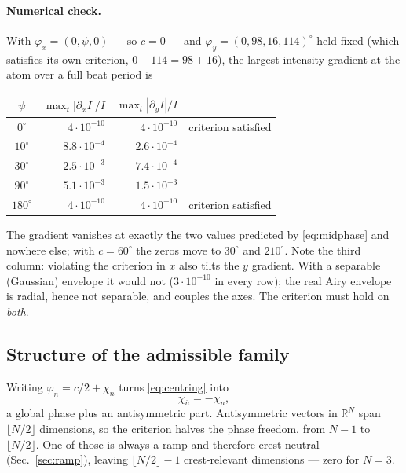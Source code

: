 \documentclass[11pt,a4paper]{article}
\begin{document}
\paragraph{Numerical check.} With $\varphi_x=(0,\psi,0)$ --- so $c=0$ --- and
$\varphi_y=(0,98,16,114)^\circ$ held fixed (which satisfies its own criterion,
$0+114=98+16$), the largest intensity gradient at the atom over a full beat
period is

\begin{center}\small
\begin{tabular}{crrl}
\toprule
$\psi$ & $\max_t|\partial_xI|/I$ & $\max_t|\partial_yI|/I$ &\\
\midrule
$0^\circ$ & $4\cdot10^{-10}$ & $4\cdot10^{-10}$ & criterion satisfied\\
$10^\circ$ & $8.8\cdot10^{-4}$ & $2.6\cdot10^{-4}$ &\\
$30^\circ$ & $2.5\cdot10^{-3}$ & $7.4\cdot10^{-4}$ &\\
$90^\circ$ & $5.1\cdot10^{-3}$ & $1.5\cdot10^{-3}$ &\\
$180^\circ$ & $4\cdot10^{-10}$ & $4\cdot10^{-10}$ & criterion satisfied\\
\bottomrule
\end{tabular}
\end{center}

\noindent The gradient vanishes at exactly the two values predicted by
\eqref{eq:midphase} and nowhere else; with $c=60^\circ$ the zeros move to
$30^\circ$ and $210^\circ$. Note the third column: violating the criterion in
$x$ also tilts the $y$ gradient. With a separable (Gaussian) envelope it would
not ($3\cdot10^{-10}$ in every row); the real Airy envelope is radial, hence
not separable, and couples the axes. The criterion must hold on \emph{both}.

\subsection{Structure of the admissible family}
Writing $\varphi_n=c/2+\chi_n$ turns \eqref{eq:centring} into
\begin{equation}
\chi_{\bar n}=-\chi_n ,
\label{eq:antisym}
\end{equation}
a global phase plus an antisymmetric part. Antisymmetric vectors in
$\mathbb R^N$ span $\lfloor N/2\rfloor$ dimensions, so the criterion halves the
phase freedom, from $N-1$ to $\lfloor N/2\rfloor$. One of those is always a
ramp and therefore crest-neutral (Sec.~\ref{sec:ramp}), leaving
$\lfloor N/2\rfloor-1$ crest-relevant dimensions --- zero for $N=3$.
\end{document}
